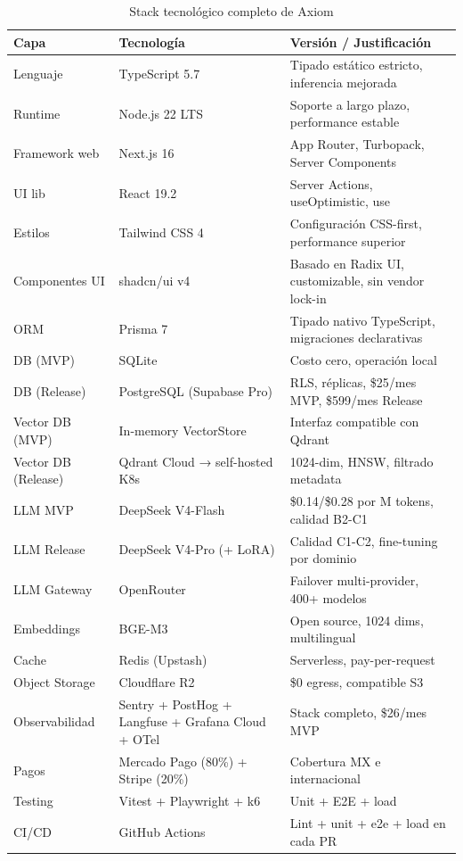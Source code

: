 \documentclass[10pt,a4paper,oneside]{report}
\begin{document}
\begin{table}[H]
\centering
\begin{tabular}{p{3.5cm}p{5cm}p{5cm}}
\toprule
\textbf{Capa} & \textbf{Tecnología} & \textbf{Versión / Justificación} \\
\midrule
Lenguaje & TypeScript 5.7 & Tipado estático estricto, inferencia mejorada \\
Runtime & Node.js 22 LTS & Soporte a largo plazo, performance estable \\
Framework web & Next.js 16 & App Router, Turbopack, Server Components \\
UI lib & React 19.2 & Server Actions, useOptimistic, use \\
Estilos & Tailwind CSS 4 & Configuración CSS-first, performance superior \\
Componentes UI & shadcn/ui v4 & Basado en Radix UI, customizable, sin vendor lock-in \\
ORM & Prisma 7 & Tipado nativo TypeScript, migraciones declarativas \\
DB (MVP) & SQLite & Costo cero, operación local \\
DB (Release) & PostgreSQL (Supabase Pro) & RLS, réplicas, \$25/mes MVP, \$599/mes Release \\
Vector DB (MVP) & In-memory VectorStore & Interfaz compatible con Qdrant \\
Vector DB (Release) & Qdrant Cloud → self-hosted K8s & 1024-dim, HNSW, filtrado metadata \\
LLM MVP & DeepSeek V4-Flash & \$0.14/\$0.28 por M tokens, calidad B2-C1 \\
LLM Release & DeepSeek V4-Pro (+ LoRA) & Calidad C1-C2, fine-tuning por dominio \\
LLM Gateway & OpenRouter & Failover multi-provider, 400+ modelos \\
Embeddings & BGE-M3 & Open source, 1024 dims, multilingual \\
Cache & Redis (Upstash) & Serverless, pay-per-request \\
Object Storage & Cloudflare R2 & \$0 egress, compatible S3 \\
Observabilidad & Sentry + PostHog + Langfuse + Grafana Cloud + OTel & Stack completo, \$26/mes MVP \\
Pagos & Mercado Pago (80\%) + Stripe (20\%) & Cobertura MX e internacional \\
Testing & Vitest + Playwright + k6 & Unit + E2E + load \\
CI/CD & GitHub Actions & Lint + unit + e2e + load en cada PR \\
\bottomrule
\end{tabular}
\caption{Stack tecnológico completo de Axiom}
\end{table}
\end{document}
